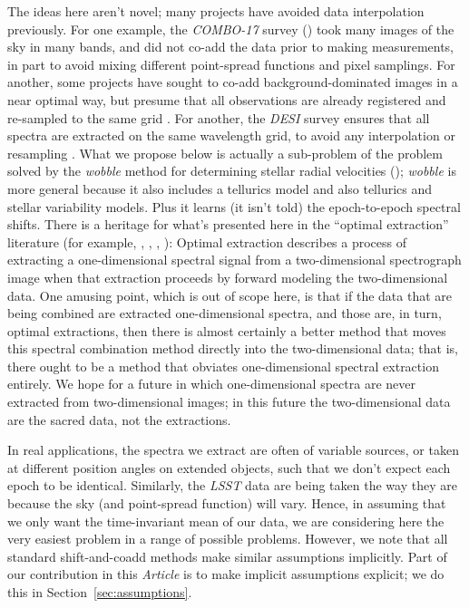 \documentclass[modern]{aastex631}
\newcommand{\documentname}{\textsl{Article}}
\newcommand{\sectionname}{Section}
\begin{document}
The ideas here aren't novel; many projects have avoided data interpolation previously.
For one example, the \textsl{COMBO-17} survey (\citealt{combo17}) took many images of the sky in many bands, and did not co-add the data prior to making measurements, in part to avoid mixing different point-spread functions and pixel samplings.
For another, some projects have sought to co-add background-dominated images in a near optimal way, but presume that all observations are already registered and re-sampled to the same grid \citep{zackay}.
For another, the \textsl{DESI} survey ensures that all spectra are extracted on the same wavelength grid, to avoid any interpolation or resampling \citep{desipipeline}.
What we propose below is actually a sub-problem of the problem solved by the \textsl{wobble} method for determining stellar radial velocities (\citealt{wobble}); \textsl{wobble} is more general because it also includes a tellurics model and also tellurics and stellar variability models.
Plus it learns (it isn't told) the epoch-to-epoch spectral shifts.
There is a heritage for what's presented here in the ``optimal extraction'' literature (for example, \citealt{oe}, \citealt{kelson}, \citealt{froe}, \citealt{sp}):
Optimal extraction describes a process of extracting a one-dimensional spectral signal from a two-dimensional spectrograph image when that extraction proceeds by forward modeling the two-dimensional data.
One amusing point, which is out of scope here, is that if the data that are being combined are extracted one-dimensional spectra, and those are, in turn, optimal extractions, then there is almost certainly a better method that moves this spectral combination method directly into the two-dimensional data; that is, there ought to be a method that obviates one-dimensional spectral extraction entirely.
We hope for a future in which one-dimensional spectra are never extracted from two-dimensional images; in this future the two-dimensional data are the sacred data, not the extractions.

In real applications, the spectra we extract are often of variable sources, or taken at different position angles on extended objects, such that we don't expect each epoch to be identical.
Similarly, the \textsl{LSST} data are being taken the way they are because the sky (and point-spread function) will vary.
Hence, in assuming that we only want the time-invariant mean of our data, we are considering here the very easiest problem in a range of possible problems.
However, we note that all standard shift-and-coadd methods make similar assumptions implicitly.
Part of our contribution in this \documentname{} is to make implicit assumptions explicit; we do this in \sectionname~\ref{sec:assumptions}.
\end{document}
